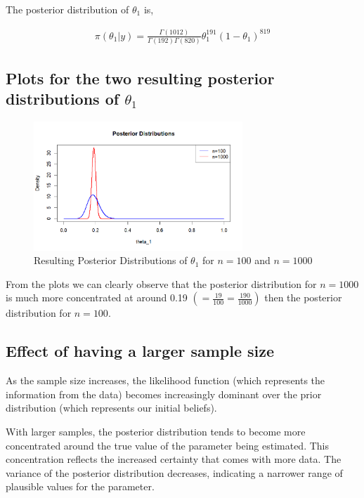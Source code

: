 \documentclass[a4paper]{article}
\begin{document}
The posterior distribution of \(\theta_1\) is,

\begin{align*}
    \pi(\theta_1|y) = \frac{\Gamma(1012)}{\Gamma(192)\Gamma(820)}\theta_1^{191}(1-\theta_1)^{819}
\end{align*}

\newpage

\subsection*{Plots for the two resulting posterior distributions of \(\theta_1\)}
\begin{figure}[htbp] %
    \centering
    \includegraphics[width=0.7\textwidth]{Posterior_Distribution.png}
    \caption{Resulting Posterior Distributions of \(\theta_1\) for \(n = 100\) and \(n = 1000\)}
    \label{fig:myimage}
\end{figure}

From the plots we can clearly observe that the posterior distribution for \(n = 1000\) is much more concentrated at around 0.19 \( \left(= \frac{19}{100} = \frac{190}{1000}\right)\) then the posterior distribution for \(n=100\).

\subsection*{Effect of having a larger sample size}
As the sample size increases, the likelihood function (which represents the information from the data) becomes increasingly dominant over the prior distribution (which represents our initial beliefs).

With larger samples, the posterior distribution tends to become more concentrated around the true value of the parameter being estimated.
This concentration reflects the increased certainty that comes with more data.
The variance of the posterior distribution decreases, indicating a narrower range of plausible values for the parameter.
\end{document}
